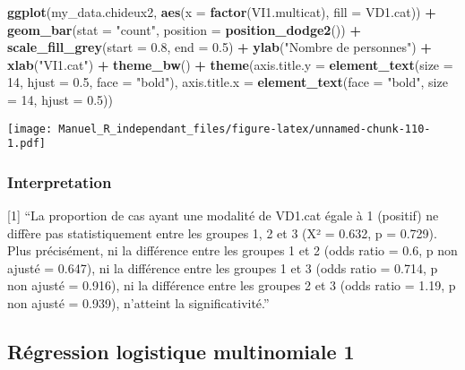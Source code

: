 \documentclass[
]{book}
\newenvironment{Shaded}{\begin{snugshade}}{\end{snugshade}}
\newcommand{\DataTypeTok}[1]{\textcolor[rgb]{0.13,0.29,0.53}{#1}}
\newcommand{\DecValTok}[1]{\textcolor[rgb]{0.00,0.00,0.81}{#1}}
\newcommand{\FloatTok}[1]{\textcolor[rgb]{0.00,0.00,0.81}{#1}}
\newcommand{\KeywordTok}[1]{\textcolor[rgb]{0.13,0.29,0.53}{\textbf{#1}}}
\newcommand{\NormalTok}[1]{#1}
\newcommand{\OperatorTok}[1]{\textcolor[rgb]{0.81,0.36,0.00}{\textbf{#1}}}
\newcommand{\StringTok}[1]{\textcolor[rgb]{0.31,0.60,0.02}{#1}}
\begin{document}
\begin{Shaded}
\begin{Highlighting}[]
\KeywordTok{ggplot}\NormalTok{(my_data.chideux2, }\KeywordTok{aes}\NormalTok{(}\DataTypeTok{x =} \KeywordTok{factor}\NormalTok{(VI1.multicat), }\DataTypeTok{fill =}\NormalTok{ VD1.cat)) }\OperatorTok{+}\StringTok{ }
\StringTok{  }\KeywordTok{geom_bar}\NormalTok{(}\DataTypeTok{stat =} \StringTok{"count"}\NormalTok{, }\DataTypeTok{position =} \KeywordTok{position_dodge2}\NormalTok{())  }\OperatorTok{+}
\StringTok{  }\KeywordTok{scale_fill_grey}\NormalTok{(}\DataTypeTok{start =} \FloatTok{0.8}\NormalTok{, }\DataTypeTok{end =} \FloatTok{0.5}\NormalTok{) }\OperatorTok{+}
\StringTok{  }\KeywordTok{ylab}\NormalTok{(}\StringTok{"Nombre de personnes"}\NormalTok{) }\OperatorTok{+}\StringTok{ }\KeywordTok{xlab}\NormalTok{(}\StringTok{"VI1.cat"}\NormalTok{) }\OperatorTok{+}\StringTok{ }
\StringTok{  }\KeywordTok{theme_bw}\NormalTok{() }\OperatorTok{+}\StringTok{ }
\StringTok{  }\KeywordTok{theme}\NormalTok{(}\DataTypeTok{axis.title.y =} \KeywordTok{element_text}\NormalTok{(}\DataTypeTok{size =} \DecValTok{14}\NormalTok{, }\DataTypeTok{hjust =} \FloatTok{0.5}\NormalTok{, }\DataTypeTok{face =} \StringTok{"bold"}\NormalTok{), }
        \DataTypeTok{axis.title.x =} \KeywordTok{element_text}\NormalTok{(}\DataTypeTok{face =} \StringTok{"bold"}\NormalTok{, }\DataTypeTok{size =} \DecValTok{14}\NormalTok{, }\DataTypeTok{hjust =} \FloatTok{0.5}\NormalTok{))}
\end{Highlighting}
\end{Shaded}

\texttt{[image: Manuel\_R\_independant\_files/figure-latex/unnamed-chunk-110-1.pdf]}

\hypertarget{interpretation-12}{%
\subsubsection{Interpretation}\label{interpretation-12}}

{[}1{]} ``La proportion de cas ayant une modalité de VD1.cat égale à 1 (positif) ne diffère pas statistiquement entre les groupes 1, 2 et 3 (X² = 0.632, p = 0.729). Plus précisément, ni la différence entre les groupes 1 et 2 (odds ratio = 0.6, p non ajusté = 0.647), ni la différence entre les groupes 1 et 3 (odds ratio = 0.714, p non ajusté = 0.916), ni la différence entre les groupes 2 et 3 (odds ratio = 1.19, p non ajusté = 0.939), n'atteint la significativité.''

\hypertarget{ruxe9gression-logistique-multinomiale-1}{%
\subsection{Régression logistique multinomiale 1}\label{ruxe9gression-logistique-multinomiale-1}}
\end{document}
